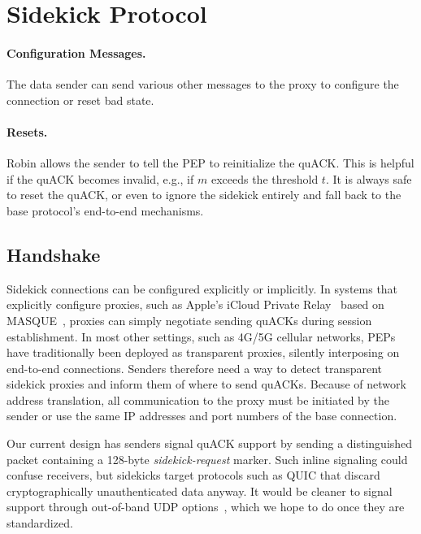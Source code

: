 \section{Sidekick Protocol}

\paragraph{Configuration Messages.}

The data sender can send various other messages to the proxy
to configure the connection or reset bad state.

\paragraph{Resets.}
Robin allows the sender to tell the PEP to reinitialize the quACK.
This is helpful if the quACK becomes
invalid, e.g., if $m$ exceeds the threshold $t$. It is
always safe to reset the quACK, or even to ignore the sidekick entirely and
fall back to the base protocol's end-to-end mechanisms.

\subsection{Handshake}

Sidekick connections can be configured explicitly or implicitly.  In systems that
explicitly configure proxies, such as Apple's iCloud Private Relay~\cite{icloud-private-relay}
based on MASQUE~\cite{kosek2021masque,kramer2021masquepep}, proxies can simply negotiate
sending quACKs during session establishment.  In most other settings,
such as 4G/5G cellular networks, PEPs have traditionally been deployed
as transparent proxies, silently interposing on end-to-end
connections.  Senders therefore need a way to detect transparent sidekick
proxies and inform them of where to send quACKs.  Because of network
address translation, all communication to the proxy must be initiated
by the sender or use the same IP addresses and port numbers of the
base connection.

Our current design has senders signal quACK support by sending a
distinguished packet containing a 128-byte \emph{sidekick-request} marker.  Such
inline signaling could confuse receivers, but {sidekick}s target
protocols such as QUIC that discard cryptographically unauthenticated
data anyway.  It would be cleaner to signal support through
out-of-band UDP options~\cite{ietf-tsvwg-udp-options-28}, which we hope to do
once they are standardized.

